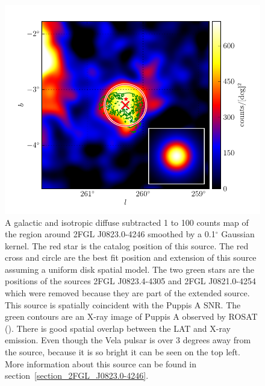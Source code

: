 \documentclass[12pt,preprint]{aastex}
\newcommand{\gev}{\text{GeV}\xspace}
\renewcommand{\deg}{\ensuremath{^\circ}\xspace}
\begin{document}
\begin{figure}
  \begin{center}
    \includegraphics[type=pdf,ext=.pdf,read=.pdf]{source_plots/source_1FGL_J0823.3-4248}
  \end{center}
  \caption{A galactic and isotropic diffuse subtracted 1 \gev to 100
  \gev counts map of the region around 2FGL J0823.0-4246 smoothed by a
  0.1\deg Gaussian kernel.  The red star is the catalog position of this source.  
  The red cross and circle are the best fit position
  and extension of this source assuming a uniform disk spatial model.
  The two green stars are the positions of the sources 2FGL J0823.4-4305
  and 2FGL J0821.0-4254 which were removed because they are part of the
  extended source.  This source is spatially coincident with the Puppis
  A SNR. The green contours are an X-ray image of Puppis A observed by
  ROSAT (\cite{rosat_puppis_a}). There is good spatial overlap between
  the LAT and X-ray emission.  Even though the Vela pulsar is over 3
  degrees away from the source, because it is so bright it can be seen
  on the top left.  More information about this source can be found in 
  section~\ref{section_2FGL_J0823.0-4246}.
  }\label{1FGL_J0823.3-4248}
\end{figure}
\end{document}
